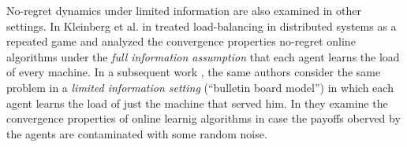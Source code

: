 No-regret dynamics under limited information are also examined
in other settings. In Kleinberg et al. in \cite{KPT09} treated 
load-balancing in distributed systems as
a repeated game and analyzed the convergence properties
no-regret online algorithms under the \emph{full information assumption} 
that each agent learns the load of every machine. 
In a subsequent work \cite{KPT11}, the same authors consider the
same problem in a \emph{limited information setting} (\enquote{bulletin board model})
in which each agent learns the load of just the machine 
that served him. In \cite{HCM17,MS17} they examine the convergence
properties of online learnig algorithms in case the payoffs oberved 
by the agents are contaminated with some random noise. 





